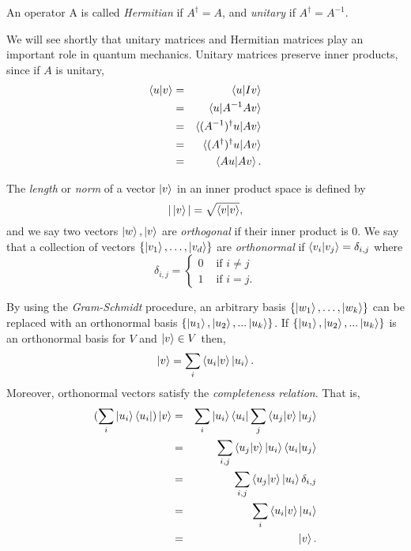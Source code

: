 \begin{definition}
\label{def herm}
An operator A is called \textit{Hermitian} if $A^\dagger = A$, and \textit{unitary} if $A^\dagger =A^{-1}$. 
\end{definition}
We will see shortly that unitary matrices and Hermitian matrices play an important role in quantum mechanics.  Unitary matrices preserve inner products, since if $A$ is unitary,
\begin{eqnarray}
\braket{u|v} &=& \braket{u|Iv}\\
&=& \braket{u|A^{-1}Av}\\
&=& \braket{(A^{-1})^\dagger u|Av}\\
&=& \braket{(A^\dagger)^\dagger u|Av}\\
&=& \braket{Au|Av}.
\end{eqnarray}

The \textit{length} or \textit{norm} of a vector $\ket{v}$ in an inner product space is defined by
\begin{equation}
    |\ket{v}|=\sqrt{\braket{v|v}},
\end{equation}
and we say two vectors $\ket{w}, \ket{v}$ are \textit{orthogonal} if their inner product is $0$.  We say that a collection of vectors $\{\ket{v_1},\hdots,\ket{v_d}\}$  are \textit{orthonormal} if $\braket{v_i | v_j}={\delta}_{i,j}$ where 
$${\delta}_{i,j}=
\begin{cases} 0 & \textrm{ if }i\neq j\\
1 & \textrm{ if } i=j.
\end{cases}$$


By using the \textit{Gram-Schmidt} procedure, an arbitrary basis $\{\ket{w_1},\hdots,\ket{w_k}\}$ can be replaced with an orthonormal basis $\{\ket{u_1}, \ket{u_2}, ...\ket{u_k}\}$.  If $\{\ket{u_1}, \ket{u_2}, ...\ket{u_k}\}$ is an orthonormal basis for $V$ and $\ket{v} \in V$ then, 
$$\ket{v}=\sum\limits_i\braket{u_i|v}\ket{u_i} .$$
Moreover, orthonormal vectors satisfy the \textit{completeness relation}.  That is, 
\begin{eqnarray*}
    (\sum_i \ket{u_i}\bra{u_i})\ket{v}&=&
    \sum_i \ket{u_i}\bra{u_i}\sum_j \braket{u_j|v} \ket{u_j}\\
    &=& \sum_{i,j}\braket{u_j|v}\ket{u_i}\braket{u_i|u_j}\\
    &=& \sum_{i,j}\braket{u_j|v}\ket{u_i}\delta_{i,j}\\
    &=&\sum_i \braket{u_i|v}\ket{u_i}\\
    &=&\ket{v}.
\end{eqnarray*}

